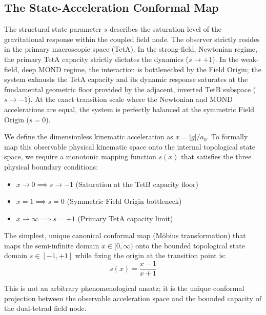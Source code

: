 \documentclass[twocolumn]{iopjournal}
\begin{document}
\subsection*{The State-Acceleration Conformal Map}
The structural state parameter $s$ describes the saturation level of the gravitational response within the coupled field node. The observer strictly resides in the primary macroscopic space (TetA). In the strong-field, Newtonian regime, the primary TetA capacity strictly dictates the dynamics ($s \to +1$). In the weak-field, deep MOND regime, the interaction is bottlenecked by the Field Origin; the system exhausts the TetA capacity and its dynamic response saturates at the fundamental geometric floor provided by the adjacent, inverted TetB subspace ($s \to -1$). At the exact transition scale where the Newtonian and MOND accelerations are equal, the system is perfectly balanced at the symmetric Field Origin ($s = 0$).

We define the dimensionless kinematic acceleration as $x = |g|/a_0$. To formally map this observable physical kinematic space onto the internal topological state space, we require a monotonic mapping function $s(x)$ that satisfies the three physical boundary conditions:
\begin{itemize}
    \item $x \to 0 \implies s \to -1$ (Saturation at the TetB capacity floor)
    \item $x = 1 \implies s = 0$ (Symmetric Field Origin bottleneck)
    \item $x \to \infty \implies s = +1$ (Primary TetA capacity limit)
\end{itemize}

The simplest, unique canonical conformal map (M\"obius transformation) that maps the semi-infinite domain $x \in [0, \infty)$ onto the bounded topological state domain $s \in [-1, +1]$ while fixing the origin at the transition point is:
\begin{equation}
s(x) = \frac{x - 1}{x + 1}
\end{equation}

This is not an arbitrary phenomenological ansatz; it is the unique conformal projection between the observable acceleration space and the bounded capacity of the dual-tetrad field node.
\end{document}
